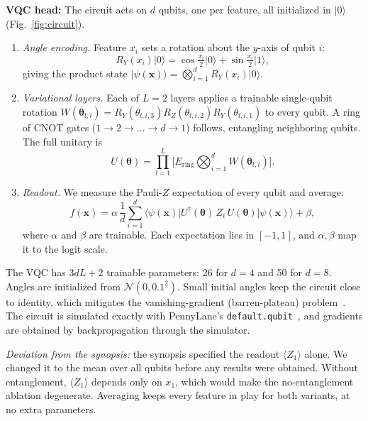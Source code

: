 \documentclass[conference]{IEEEtran}
\begin{document}
\textbf{VQC head:} The circuit acts on $d$ qubits, one per feature, all
initialized in $\lvert0\rangle$ (Fig.~\ref{fig:circuit}).
\begin{enumerate}
\item \emph{Angle encoding.} Feature $x_i$ sets a rotation about the
$y$-axis of qubit $i$:
\begin{equation}
R_Y(x_i)\lvert0\rangle=\cos\tfrac{x_i}{2}\lvert0\rangle+\sin\tfrac{x_i}{2}\lvert1\rangle,
\end{equation}
giving the product state
$\lvert\psi(\mathbf{x})\rangle=\bigotimes_{i=1}^{d}R_Y(x_i)\lvert0\rangle$.
\item \emph{Variational layers.} Each of $L=2$ layers applies a trainable
single-qubit rotation
$W(\boldsymbol{\theta}_{l,i})=R_Y(\theta_{l,i,3})R_Z(\theta_{l,i,2})R_Y(\theta_{l,i,1})$
to every qubit. A ring of CNOT gates
($1\!\to\!2\!\to\!\dots\!\to\!d\!\to\!1$) follows, entangling neighboring
qubits. The full unitary is
\begin{equation}
U(\boldsymbol{\theta})=\prod_{l=1}^{L}\Big[E_{\mathrm{ring}}\bigotimes_{i=1}^{d}W(\boldsymbol{\theta}_{l,i})\Big].
\end{equation}
\item \emph{Readout.} We measure the Pauli-$Z$ expectation of every qubit
and average:
\begin{equation}
f(\mathbf{x})=\alpha\,\frac{1}{d}\sum_{i=1}^{d}
\langle\psi(\mathbf{x})\rvert U^\dagger(\boldsymbol{\theta})\,Z_i\,U(\boldsymbol{\theta})\lvert\psi(\mathbf{x})\rangle+\beta,
\end{equation}
where $\alpha$ and $\beta$ are trainable. Each expectation lies in
$[-1,1]$, and $\alpha,\beta$ map it to the logit scale.
\end{enumerate}
The VQC has $3dL+2$ trainable parameters: 26 for $d=4$ and 50 for $d=8$.
Angles are initialized from $\mathcal{N}(0,0.1^2)$. Small initial angles
keep the circuit close to identity, which mitigates the vanishing-gradient
(barren-plateau) problem~\cite{mcclean2018}. The circuit is simulated
exactly with PennyLane's \texttt{default.qubit}~\cite{bergholm2018}, and
gradients are obtained by backpropagation through the simulator.

\emph{Deviation from the synopsis:} the synopsis specified the readout
$\langle Z_1\rangle$ alone. We changed it to the mean over all qubits
before any results were obtained. Without entanglement, $\langle Z_1\rangle$
depends only on $x_1$, which would make the no-entanglement ablation
degenerate. Averaging keeps every feature in play for both variants, at no
extra parameters.
\end{document}
